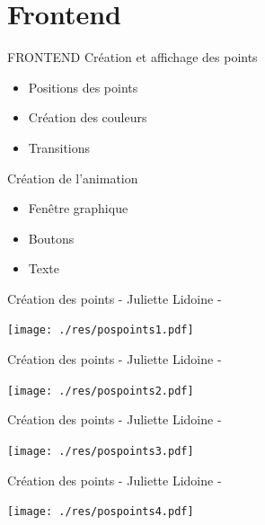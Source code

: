 \documentclass[aspectratio=169]{beamer}
\begin{document}
\section{Frontend}

\begin{frame}[fragile=singleslide]{FRONTEND}
    Création et affichage des points
    \begin{itemize}
        \item Positions des points 
        \item Création des couleurs
        \item Transitions
    \end{itemize}
    Création de l'animation 
    \begin{itemize}
        \item Fenêtre graphique
        \item Boutons
        \item Texte
    \end{itemize}
\end{frame}

\begin{frame}[fragile=singleslide]{Création des points \qquad \qquad \qquad \qquad \qquad \qquad \qquad - Juliette Lidoine -}
    \begin{center}
        \texttt{[image: ./res/pospoints1.pdf]}
    \end{center}
\end{frame}

\begin{frame}[fragile=singleslide]{Création des points \qquad \qquad \qquad \qquad \qquad \qquad \qquad - Juliette Lidoine -}
    \begin{center}
        \texttt{[image: ./res/pospoints2.pdf]}
    \end{center}
\end{frame}

\begin{frame}[fragile=singleslide]{Création des points \qquad \qquad \qquad \qquad \qquad \qquad \qquad - Juliette Lidoine -}
    \begin{center}
        \texttt{[image: ./res/pospoints3.pdf]}
    \end{center}
\end{frame}

\begin{frame}[fragile=singleslide]{Création des points \qquad \qquad \qquad \qquad \qquad \qquad \qquad - Juliette Lidoine -}
    \begin{center}
        \texttt{[image: ./res/pospoints4.pdf]}
    \end{center}
\end{frame}
\end{document}
